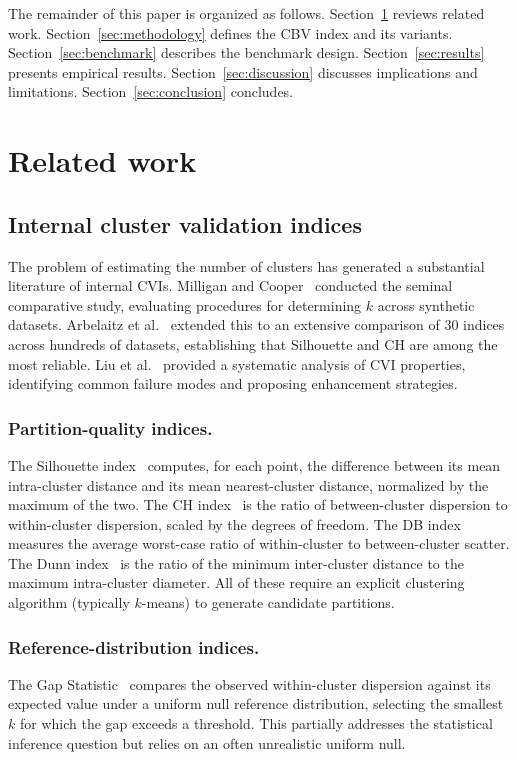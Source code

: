 \documentclass[journal]{IEEEtran}
\begin{document}
The remainder of this paper is organized as follows. Section~\ref{sec:related-work} reviews related work. Section~\ref{sec:methodology} defines the CBV index and its variants. Section~\ref{sec:benchmark} describes the benchmark design. Section~\ref{sec:results} presents empirical results. Section~\ref{sec:discussion} discusses implications and limitations. Section~\ref{sec:conclusion} concludes.

\section{Related work}
\label{sec:related-work}

\subsection{Internal cluster validation indices}
\label{sec:CVI}

The problem of estimating the number of clusters has generated a substantial literature of internal CVIs. Milligan and Cooper~\cite{milligan1985examination} conducted the seminal comparative study, evaluating procedures for determining $k$ across synthetic datasets. Arbelaitz et al.~\cite{arbelaitz2013extensive} extended this to an extensive comparison of 30 indices across hundreds of datasets, establishing that Silhouette and CH are among the most reliable. Liu et al.~\cite{liu2010understanding} provided a systematic analysis of CVI properties, identifying common failure modes and proposing enhancement strategies.

\subsubsection*{Partition-quality indices.}
The Silhouette index~\cite{rousseeuw1987silhouettes} computes, for each point, the difference between its mean intra-cluster distance and its mean nearest-cluster distance, normalized by the maximum of the two. The CH index~\cite{calinski1974dendrite} is the ratio of between-cluster dispersion to within-cluster dispersion, scaled by the degrees of freedom. The DB index~\cite{davies1979cluster} measures the average worst-case ratio of within-cluster to between-cluster scatter. The Dunn index~\cite{dunn1973fuzzy} is the ratio of the minimum inter-cluster distance to the maximum intra-cluster diameter. All of these require an explicit clustering algorithm (typically $k$-means) to generate candidate partitions.

\subsubsection*{Reference-distribution indices.}
The Gap Statistic~\cite{tibshirani2001estimating} compares the observed within-cluster dispersion against its expected value under a uniform null reference distribution, selecting the smallest $k$ for which the gap exceeds a threshold. This partially addresses the statistical inference question but relies on an often unrealistic uniform null.
\end{document}
